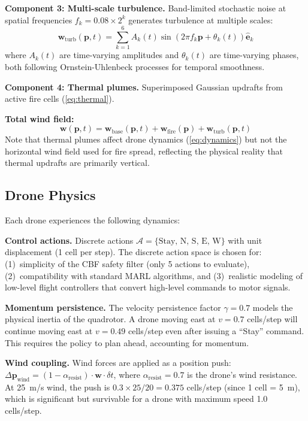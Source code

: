 \documentclass[12pt,a4paper]{article}
\DeclareRobustCommand{\cA}{\mathcal{A}}
\DeclareRobustCommand{\vect}[1]{\bm{#1}}
\begin{document}
\textbf{Component 3: Multi-scale turbulence.}
Band-limited stochastic noise at spatial frequencies $f_k = 0.08 \times 2^k$ generates turbulence at multiple scales:
\begin{equation}
    \vect{w}_{\text{turb}}(\vect{p}, t) = \sum_{k=1}^{6} A_k(t) \sin(2\pi f_k \vect{p} + \theta_k(t)) \hat{\vect{e}}_k
\end{equation}
where $A_k(t)$ are time-varying amplitudes and $\theta_k(t)$ are time-varying phases, both following Ornstein-Uhlenbeck processes for temporal smoothness.

\textbf{Component 4: Thermal plumes.}
Superimposed Gaussian updrafts from active fire cells (\eqref{eq:thermal}).

\textbf{Total wind field:}
\begin{equation}
    \vect{w}(\vect{p}, t) = \vect{w}_{\text{base}}(\vect{p}, t) + \vect{w}_{\text{fire}}(\vect{p}) + \vect{w}_{\text{turb}}(\vect{p}, t)
\end{equation}
Note that thermal plumes affect drone dynamics (\eqref{eq:dynamics}) but not the horizontal wind field used for fire spread, reflecting the physical reality that thermal updrafts are primarily vertical.

\subsection{Drone Physics}

Each drone experiences the following dynamics:

\textbf{Control actions.} Discrete actions $\cA = \{\text{Stay, N, S, E, W}\}$ with unit displacement (1 cell per step). The discrete action space is chosen for: (1)~simplicity of the CBF safety filter (only 5 actions to evaluate), (2)~compatibility with standard MARL algorithms, and (3)~realistic modeling of low-level flight controllers that convert high-level commands to motor signals.

\textbf{Momentum persistence.} The velocity persistence factor $\gamma = 0.7$ models the physical inertia of the quadrotor. A drone moving east at $v = 0.7$ cells/step will continue moving east at $v = 0.49$ cells/step even after issuing a ``Stay'' command. This requires the policy to plan ahead, accounting for momentum.

\textbf{Wind coupling.} Wind forces are applied as a position push: $\Delta\vect{p}_{\text{wind}} = (1 - \alpha_{\text{resist}}) \cdot \vect{w} \cdot \delta t$, where $\alpha_{\text{resist}} = 0.7$ is the drone's wind resistance. At 25~m/s wind, the push is $0.3 \times 25 / 20 = 0.375$ cells/step (since 1 cell = 5~m), which is significant but survivable for a drone with maximum speed 1.0 cells/step.
\end{document}
